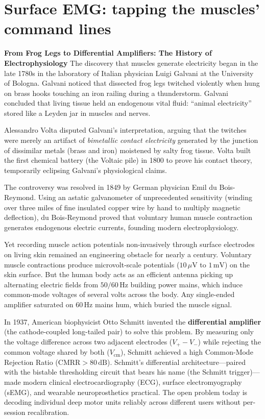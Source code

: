 \section{Surface EMG: tapping the muscles' command lines}
\label{ch37:emg}

\begin{historybox}
\textbf{From Frog Legs to Differential Amplifiers: The History of Electrophysiology}
The discovery that muscles generate electricity began in the late 1780s in the laboratory of Italian physician Luigi Galvani at the University of Bologna. Galvani noticed that dissected frog legs twitched violently when hung on brass hooks touching an iron railing during a thunderstorm. Galvani concluded that living tissue held an endogenous vital fluid: ``animal electricity'' stored like a Leyden jar in muscles and nerves.

Alessandro Volta disputed Galvani's interpretation, arguing that the twitches were merely an artifact of \emph{bimetallic contact electricity} generated by the junction of dissimilar metals (brass and iron) moistened by salty frog tissue. Volta built the first chemical battery (the Voltaic pile) in 1800 to prove his contact theory, temporarily eclipsing Galvani's physiological claims.

The controversy was resolved in 1849 by German physician Emil du Bois-Reymond. Using an astatic galvanometer of unprecedented sensitivity (winding over three miles of fine insulated copper wire by hand to multiply magnetic deflection), du Bois-Reymond proved that voluntary human muscle contraction generates endogenous electric currents, founding modern electrophysiology.

Yet recording muscle action potentials non-invasively through surface electrodes on living skin remained an engineering obstacle for nearly a century. Voluntary muscle contractions produce microvolt-scale potentials ($10\,\mu\text{V}$ to $1\,\text{mV}$) on the skin surface. But the human body acts as an efficient antenna picking up alternating electric fields from $50/60\,\text{Hz}$ building power mains, which induce common-mode voltages of several volts across the body. Any single-ended amplifier saturated on $60\,\text{Hz}$ mains hum, which buried the muscle signal.

In 1937, American biophysicist Otto Schmitt invented the \textbf{differential amplifier} (the cathode-coupled long-tailed pair) to solve this problem. By measuring only the voltage difference across two adjacent electrodes ($V_+ - V_-$) while rejecting the common voltage shared by both ($V_{\text{cm}}$), Schmitt achieved a high Common-Mode Rejection Ratio ($\text{CMRR} > 80\,\text{dB}$). Schmitt's differential architecture---paired with the bistable thresholding circuit that bears his name (the Schmitt trigger)---made modern clinical electrocardiography (ECG), surface electromyography (sEMG), and wearable neuroprosthetics practical. The open problem today is decoding individual deep motor units reliably across different users without per-session recalibration.
\end{historybox}

